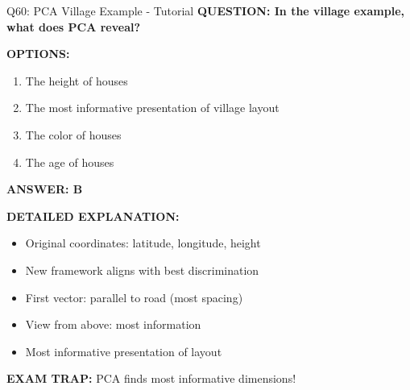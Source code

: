\documentclass[8pt]{beamer}
\begin{document}
	\begin{frame}{Q60: PCA Village Example - Tutorial}
		\fontsize{6.5}{7.5}\selectfont
		\textbf{QUESTION: In the village example, what does PCA reveal?}
		
		\vspace{0.1cm}
		\textbf{OPTIONS:}
		\begin{enumerate}
			\item The height of houses
			\item The most informative presentation of village layout
			\item The color of houses
			\item The age of houses
		\end{enumerate}
		
		\vspace{0.1cm}
		\textcolor{myblue}{\textbf{ANSWER: B}}
		
		\vspace{0.1cm}
		\textbf{DETAILED EXPLANATION:}
		\begin{itemize}
			\item Original coordinates: latitude, longitude, height
			\item New framework aligns with best discrimination
			\item First vector: parallel to road (most spacing)
			\item View from above: most information
			\item Most informative presentation of layout
		\end{itemize}
		
		\vspace{0.1cm}
		\textcolor{myred}{\textbf{EXAM TRAP:}} PCA finds \textcolor{myblue}{most informative dimensions}!
	\end{frame}
	
\end{document}
